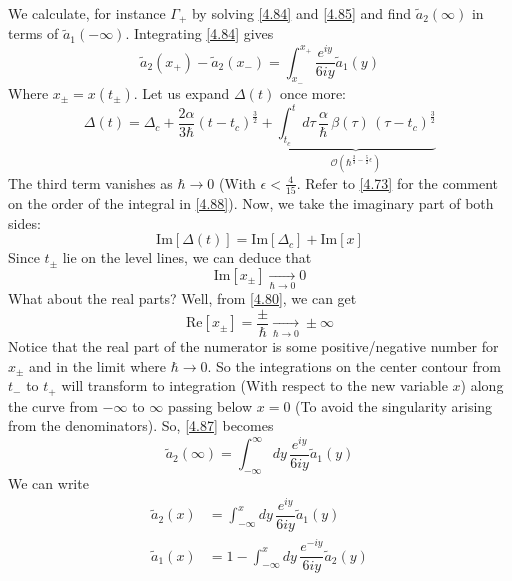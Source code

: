 \documentclass[12pt,a4paper]{article}
\begin{document}
	We calculate, for instance $\Gamma_{+}$ by solving \eqref{4.84} and \eqref{4.85} and find $\tilde{a}_{2}(\infty)$ in terms of $\tilde{a}_{1}(-\infty)$. Integrating \eqref{4.84} gives
	\begin{equation}
		\tilde{a}_{2}(x_{+}) - \tilde{a}_{2}(x_{-}) = \int_{x_{-}}^{x_{+}} \dfrac{e^{iy}}{6iy} \tilde{a}_{1}(y) \label{4.87}
	\end{equation}
	Where $x_{\pm} = x(t_{\pm})$. Let us expand $\Delta(t)$ once more:
	\begin{equation}
		\Delta(t) = \Delta_{c} + \frac{2\alpha}{3\hbar} \left( t - t_{c} \right)^{\frac{3}{2}} + \underbrace{\int_{t_{c}}^{t} d\tau\, \frac{\alpha}{\hbar}\, \beta(\tau)\, \left( \tau - t_{c} \right)^{\frac{3}{2}}}_{\mathcal{O}\left( \hbar^{\frac{2}{3} - \frac{5}{2} \epsilon} \right)} \label{4.88}
	\end{equation}
	The third term vanishes as $\hbar \rightarrow 0$ (With $\epsilon < \frac{4}{15}$. Refer to \eqref{4.73} for the comment on the order of the integral in \eqref{4.88}). Now, we take the imaginary part of both sides:
	\begin{equation}
		\mathrm{Im}[\Delta(t)] = \mathrm{Im}[\Delta_{c}] + \mathrm{Im}[x] \label{4.89}
	\end{equation}
	Since $t_{\pm}$ lie on the level lines, we can deduce that
	\begin{equation}
		\mathrm{Im}[x_{\pm}] \xrightarrow[\hbar \rightarrow 0]{} 0
	\end{equation}
	What about the real parts? Well, from \eqref{4.80}, we can get
	\begin{equation}
		\mathrm{Re}[x_{\pm}] = \frac{\pm}{\hbar} \xrightarrow[\hbar \rightarrow 0]{} \pm \infty
	\end{equation}
	Notice that the real part of the numerator is some positive/negative number for $x_{\pm}$ and in the limit where $\hbar \rightarrow 0$.‌ So the integrations on the center contour from $t_{-}$ to $t_{+}$ will transform to integration (With respect to the new variable $x$) along the curve from $-\infty$ to $\infty$ passing below $x = 0$ (To avoid the singularity arising from the denominators). So, \eqref{4.87} becomes
	\begin{equation}
		\tilde{a}_{2}(\infty) = \int_{-\infty}^{\infty} dy\, \frac{e^{iy}}{6iy} \tilde{a}_{1}(y) \label{4.92}
	\end{equation}
	We can write
	\begin{align}
		\tilde{a}_{2}(x) &= \int_{-\infty}^{x} dy\, \dfrac{e^{iy}}{6iy} \tilde{a}_{1}(y) \label{4.93} \\[5pt]
		\tilde{a}_{1}(x) &= 1 - \int_{-\infty}^{x} dy\, \dfrac{e^{-iy}}{6iy} \tilde{a}_{2}(y) \label{4.94}
	\end{align}
\end{document}
